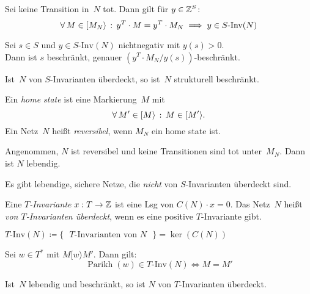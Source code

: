 \documentclass{cheat-sheet}
\newcommand{\activeTransition}[1]{[{#1}\rangle} %
\DeclareMathOperator{\Parikh}{Parikh} %
\newcommand{\SInv}{S\text{-}\mathrm{Inv}} %
\newcommand{\TInv}{T\text{-}\mathrm{Inv}} %
\begin{document}
\begin{lem}
  Sei keine Transition in~$N$ tot.
  Dann gilt für $y \in \mathbb{Z}^S$:
  \[
    \fa{M \in \activeTransition{M_N}} y^T \cdot M = y^T \cdot M_N \implies
    y \in \SInv(N)
  \]
\end{lem}

\begin{lem}
  Sei $s \in S$ und $y \in \SInv(N)$ nichtnegativ mit $y(s) > 0$. \\
  Dann ist $s$ beschränkt, genauer $(y^T \cdot M_N / y(s))$-beschränkt.
\end{lem}

\begin{lem}
  Ist~$N$ von $S$-Invarianten überdeckt, so ist~$N$ strukturell beschränkt.
\end{lem}


\begin{defn}
  Ein \emph{home state} ist eine Markierung~$M$ mit
  \[
    \fa{M' \in \activeTransition{M}} M \in \activeTransition{M'}.
  \]
  Ein Netz~$N$ heißt \emph{reversibel}, wenn $M_N$ ein home state ist.
\end{defn}

\begin{lem}
  Angenommen, $N$ ist reversibel und keine Transitionen sind tot unter~$M_N$.
  Dann ist $N$ lebendig.
\end{lem}

\begin{bem}
  Es gibt lebendige, sichere Netze, die \textit{nicht} von $S$-Invarianten überdeckt sind.
\end{bem}

\begin{defn}
  Eine \emph{$T$-Invariante} $x : T \to \mathbb{Z}$ ist eine Lsg von $C(N) \cdot x = 0$.
  Das Netz~$N$ heißt \emph{von $T$-Invarianten überdeckt}, wenn es eine positive $T$-Invariante gibt.
\end{defn}

\begin{nota}
  $\TInv(N) \coloneqq \{ \text{ $T$-Invarianten von~$N$ } \} = \ker(C(N))$
\end{nota}

\begin{lem}
  Sei $w \in T^*$ mit $M \activeTransition{w} M'$.
  Dann gilt:
  \[
    \Parikh(w) \in \TInv(N) \iff M = M'
  \]
\end{lem}

\begin{satz}
  Ist~$N$ lebendig und beschränkt, so ist $N$ von $T$-Invarianten überdeckt.
\end{satz}
\end{document}
